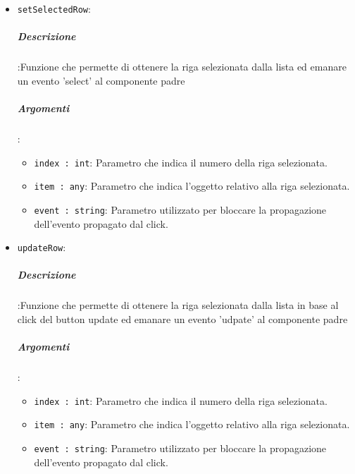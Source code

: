 \documentclass[../DefinizioneDiProdotto_v2.0.0.tex]{subfiles}
\begin{document}
			      	      \begin{itemize}
			      	      	\item \texttt{setSelectedRow}:
							\subparagraph{Descrizione}:Funzione che permette di ottenere la riga selezionata dalla lista ed emanare un evento 'select' al componente padre
			      	      	\subparagraph{Argomenti}:
			      	      	      \begin{itemize}
			      	      	      	\item \texttt{index : int}: Parametro che indica il numero della riga selezionata.
			      	      	      	\item \texttt{item : any}: Parametro che indica l'oggetto relativo alla riga selezionata.
			      	      	      	\item \texttt{event : string}: Parametro utilizzato per bloccare la propagazione dell'evento propagato dal click.
			      	      	      \end{itemize}
			      	      	\item \texttt{updateRow}:
							\subparagraph{Descrizione}:Funzione che permette di ottenere la riga selezionata dalla lista in base al click del button update ed emanare un evento 'udpate' al componente padre
			      	      	\subparagraph{Argomenti}:
			      	      	      \begin{itemize}
			      	      	      	\item \texttt{index : int}: Parametro che indica il numero della riga selezionata.
			      	      	      	\item \texttt{item : any}: Parametro che indica l'oggetto relativo alla riga selezionata.
			      	      	      	\item \texttt{event : string}: Parametro utilizzato per bloccare la propagazione dell'evento propagato dal click.
			      	      	      \end{itemize}


\end{itemize}
\end{document}
